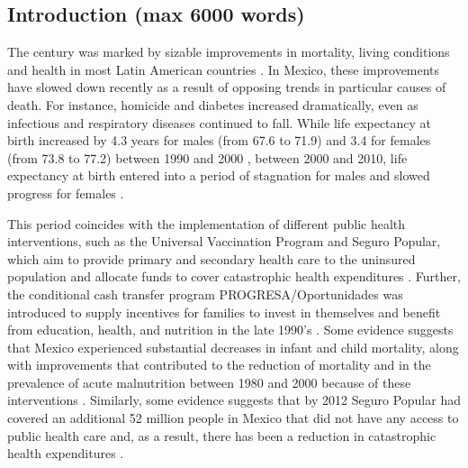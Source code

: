 \documentclass[11.5pt]{article}
\begin{document}
\begin{spacing}{1.5}
\section*{Introduction (max 6000 words)}
The  century was marked by sizable improvements in mortality, living
conditions and health in most Latin American countries \citep{who2000}. 
In Mexico, these improvements have slowed down recently as a result of opposing
trends in particular causes of death. For instance, homicide and diabetes
increased dramatically, even as infectious and
respiratory diseases continued to fall. While life
expectancy at birth increased by 4.3 years for males (from 67.6 to 71.9) and 3.4
for females (from 73.8 to 77.2) between 1990 and 2000 \citep{SOMEDE},
between 2000 and 2010, life expectancy at birth entered into a period of
stagnation for males and slowed progress for females \citep{canudas2014}. 


This
period coincides with the implementation of different public health
interventions, such as the Universal Vaccination Program and Seguro
Popular, which aim to provide primary and secondary
health care to the uninsured population and allocate funds to cover catastrophic
health expenditures \citep{knaul2005}. Further, the conditional cash transfer program PROGRESA/Oportunidades
was introduced to supply incentives for families to invest in themselves and
benefit from education, health, and nutrition in the late 1990's \citep{neufeld2012}. Some evidence
suggests that Mexico experienced substantial decreases in infant and child
mortality, along with improvements that contributed to the reduction of
mortality and in the prevalence of acute malnutrition between 1980 and 2000
because of these interventions \citep{sepulveda2006}. Similarly, some evidence
suggests that by 2012 Seguro Popular had covered an additional 52 million
people in Mexico that did not have any access to public health care and, as a result, there has been a reduction in catastrophic health expenditures \citep{knaul2012}.


\end{spacing}
\end{document}
